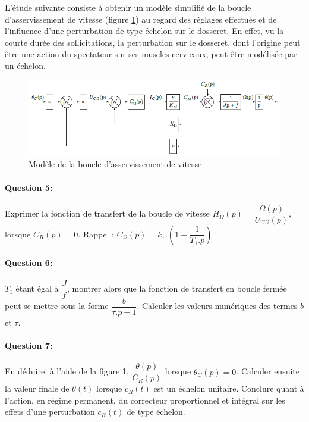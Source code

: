 L'étude suivante consiste à obtenir un modèle simplifié de la boucle d'asservissement de vitesse (figure \ref{fig13}) au regard des réglages effectués et de l'influence d'une perturbation de type échelon sur le dosseret. En effet, vu la courte durée des sollicitations, la perturbation sur le dosseret, dont l'origine peut être une action du spectateur sur ses muscles cervicaux, peut être modélisée par un échelon.

\begin{figure}[!ht]
\begin{center}
 \includegraphics[width=0.9\linewidth]{img/img14}
\end{center}
\caption{Modèle de la boucle d'asservissement de vitesse}
\label{fig13}
\end{figure}

\paragraph{Question 5:}	Exprimer la fonction de transfert de la boucle de vitesse $H_{\Omega}(p)=\dfrac{\Omega(p)}{U_{C\Omega}(p)}$, lorsque $C_R(p)=0$. Rappel : $C_{\Omega}(p)=k_1.(1+\dfrac{1}{T_1. p})$

\paragraph{Question 6:}	$T_1$ étant égal à $\dfrac{J}{f}$, montrer alors que la fonction de transfert en boucle fermée peut se mettre sous la forme $\dfrac{b}{\tau.p+1}$. Calculer les valeurs numériques des termes $b$ et $\tau$.

\paragraph{Question 7:} En déduire, à l'aide de la figure \ref{fig13}, $\dfrac{\theta(p)}{C_R(p)}$ lorsque $\theta_C(p)=0$. Calculer ensuite la valeur finale de $\theta(t)$ lorsque $c_R(t)$ est un échelon unitaire. Conclure quant à l'action, en régime permanent, du correcteur proportionnel et intégral sur les effets d'une perturbation $c_R(t)$ de type échelon.

